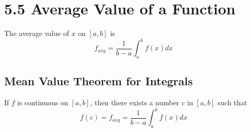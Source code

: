 %
%

\section*{5.5 Average Value of a Function}

The average value of \(x\) on \([a, b]\) is
\[ f_{avg} = \frac{1}{b-a} \int_a^b f(x)dx \]

\subsection*{Mean Value Theorem for Integrals}

If \(f\) is continuous on \([a, b]\), then there exists a number \(c\) in \([a, b]\) such that
\[ f(c) = f_{avg} = \frac{1}{b-a} \int_a^b f(x)dx \]
